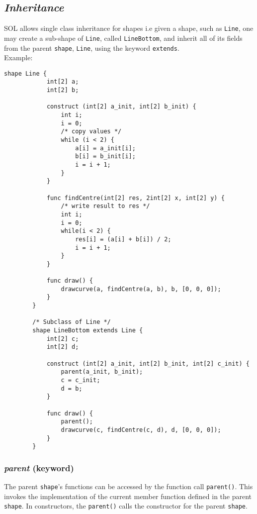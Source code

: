     \subsection{\textit{Inheritance}}
    SOL allows single class inheritance for shapes i.e given a shape, such as \texttt{Line}, one may create a sub-shape of \texttt{Line}, called \texttt{LineBottom}, and inherit all of its fields from the parent \texttt{shape}, \texttt{Line}, using the keyword \texttt{extends}.\\
    Example:\\
    \begin{lstlisting}[style=sol]
        shape Line {
            int[2] a;
            int[2] b;
            
            construct (int[2] a_init, int[2] b_init) {
                int i;
                i = 0;
                /* copy values */
                while (i < 2) {
                    a[i] = a_init[i];
                    b[i] = b_init[i];
                    i = i + 1;
                }
            }

            func findCentre(int[2] res, 2int[2] x, int[2] y) {
                /* write result to res */
                int i;
                i = 0;
                while(i < 2) {
                    res[i] = (a[i] + b[i]) / 2;
                    i = i + 1;
                }
            }
            
            func draw() {
                drawcurve(a, findCentre(a, b), b, [0, 0, 0]);
            }
        }

        /* Subclass of Line */
        shape LineBottom extends Line {
            int[2] c;
            int[2] d;

            construct (int[2] a_init, int[2] b_init, int[2] c_init) {
                parent(a_init, b_init);
                c = c_init;
                d = b;
            }

            func draw() {
                parent();
                drawcurve(c, findCentre(c, d), d, [0, 0, 0]);
            }
        }
    \end{lstlisting}

    \subsubsection{\textit{parent} (keyword)}
    The parent \texttt{shape}'s functions can be accessed by the function call \texttt{parent()}. This invokes the implementation of the current member function defined in the parent \texttt{shape}. In constructors, the \texttt{parent()} calls the constructor for the parent \texttt{shape}.
